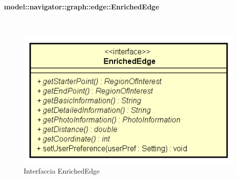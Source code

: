 \documentclass[../DefinizioneDiProdotto.tex]{subfiles}
\begin{document}
\paragraph{model::navigator::graph::edge::EnrichedEdge}
\
\begin{figure}[H]
	\centering
	\includegraphics[width=\maxwidth]{img/EnrichedEdge.png}
	\caption{Interfaccia EnrichedEdge}\label{fig:model::navigator::graph::edge::EnrichedEdge} 
\end{figure}
\end{document}
